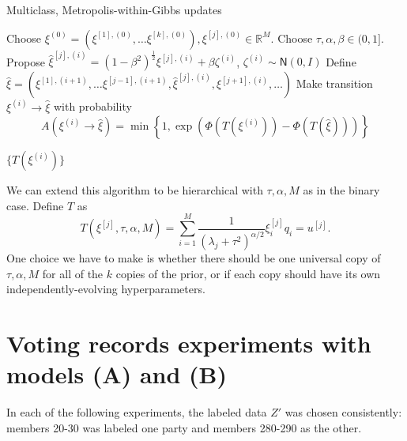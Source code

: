 \documentclass{siamart1116}
\begin{document}
        \begin{algorithm}

        \caption{Multiclass, Metropolis-within-Gibbs updates}
        \label{alg:multiclass_nonhier}
        \begin{algorithmic}[1]
        \State Choose $\xi^{(0)} = (\xi^{[1],(0)}, \ldots \xi^{[k],(0)}), \xi^{[j],(0)} \in \mathbb{R}^M$. Choose $\tau, \alpha, \beta \in (0, 1]$. 
                \State Propose $\hat\xi^{[j],(i)} = (1-\beta^2)^{\frac{1}{2}}\xi^{[j],(i)} + \beta \zeta^{(i)}$, $\zeta^{(i)} \sim \mathsf{N}(0, I)$
                \State Define $\hat \xi = (\xi^{[1],(i+1)}, \ldots \xi^{[j-1],(i+1)}, \hat\xi^{[j],(i)}, \xi^{[j+1],(i)}, \ldots)$
                \State Make transition $\xi^{(i)} \to \hat\xi$ with probability
                \[ A(\xi^{(i)} \to \hat\xi) = \min\left\{1, \exp\left(\Phi(T(\xi^{(i)})) - \Phi(T(\hat \xi))\right) \right\}\]

            \EndFor
        \EndFor

        \State \Return $\{T(\xi^{(i)})\}$
        
        \end{algorithmic}
        \end{algorithm}

        We can extend this algorithm to be hierarchical with $\tau, \alpha, M$ as in the binary case. Define $T$ as
         \[T(\xi^{[j]}, \tau, \alpha, M) = \sum_{i=1}^M \frac{1}{(\lambda_j + \tau^2)^{\alpha/2}} \xi^{[j]}_i q_i = u^{[j]}.\]
         One choice we have to make is whether there should be one universal copy of $\tau, \alpha, M$ for all of the $k$ copies of the prior, or if each copy should have its own independently-evolving hyperparameters.
\iffalse

\section{Voting records experiments with models (A) and (B)}
    In each of the following experiments, the labeled data $Z'$ was chosen consistently: members 20-30 was labeled one party and members 280-290 as the other.
\end{document}
